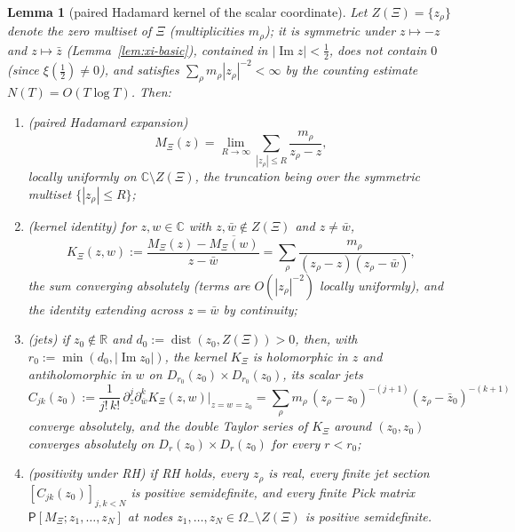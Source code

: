 \documentclass[11pt]{amsart}
\newtheorem{lemma}[theorem]{Lemma}
\theoremstyle{definition}
\theoremstyle{remark}
\theoremstyle{definition}
\renewcommand{\Im}{\operatorname{Im}}
\newcommand{\half}{\tfrac{1}{2}}
\newcommand{\R}{\mathbb{R}}
\newcommand{\C}{\mathbb{C}}
\begin{document}
\begin{lemma}[paired Hadamard kernel of the scalar coordinate]\label{lem:mxi-kernel}
Let $Z(\Xi)=\{z_\rho\}$ denote the zero multiset of $\Xi$ (multiplicities $m_\rho$); it is symmetric
under $z\mapsto-z$ and $z\mapsto\bar z$ (Lemma~\ref{lem:xi-basic}), contained in $|\Im z|<\half$, does
not contain $0$ (since $\xi(\half)\ne0$), and satisfies $\sum_\rho m_\rho|z_\rho|^{-2}<\infty$ by the
counting estimate $N(T)=O(T\log T)$.  Then:
\begin{enumerate}[label=\textnormal{(\roman*)}]
\item \textnormal{(paired Hadamard expansion)}
\[
   M_\Xi(z)
   =
   \lim_{R\to\infty}\sum_{|z_\rho|\le R}\frac{m_\rho}{z_\rho-z},
\]
locally uniformly on $\C\setminus Z(\Xi)$, the truncation being over the symmetric multiset
$\{|z_\rho|\le R\}$;
\item \textnormal{(kernel identity)} for $z,w\in\C$ with $z,\bar w\notin Z(\Xi)$ and $z\ne\bar w$,
\[
   K_\Xi(z,w)
   :=
   \frac{M_\Xi(z)-\overline{M_\Xi(w)}}{z-\bar w}
   =
   \sum_\rho\frac{m_\rho}{(z_\rho-z)(z_\rho-\bar w)},
\]
the sum converging absolutely (terms are $O(|z_\rho|^{-2})$ locally uniformly), and the identity
extending across $z=\bar w$ by continuity;
\item \textnormal{(jets)} if $z_0\notin\R$ and $d_0:=\operatorname{dist}(z_0,Z(\Xi))>0$, then, with
$r_0:=\min(d_0,|\Im z_0|)$, the kernel $K_\Xi$ is holomorphic in $z$ and antiholomorphic in $w$ on
$D_{r_0}(z_0)\times D_{r_0}(z_0)$, its scalar jets
\[
   C_{jk}(z_0)
   :=
   \frac1{j!\,k!}\,\partial_z^j\partial_{\bar w}^k K_\Xi(z,w)\big|_{z=w=z_0}
   =
   \sum_\rho m_\rho\,(z_\rho-z_0)^{-(j+1)}(z_\rho-\bar z_0)^{-(k+1)}
\]
converge absolutely, and the double Taylor series of $K_\Xi$ around $(z_0,z_0)$ converges absolutely on
$D_r(z_0)\times D_r(z_0)$ for every $r<r_0$;
\item \textnormal{(positivity under RH)} if RH holds, every $z_\rho$ is real, every finite jet section
$[C_{jk}(z_0)]_{j,k<N}$ is positive semidefinite, and every finite Pick matrix
$\mathsf P[M_\Xi;z_1,\ldots,z_N]$ at nodes $z_1,\ldots,z_N\in\Omega_-\setminus Z(\Xi)$ is positive
semidefinite.
\end{enumerate}
\end{lemma}
\end{document}
